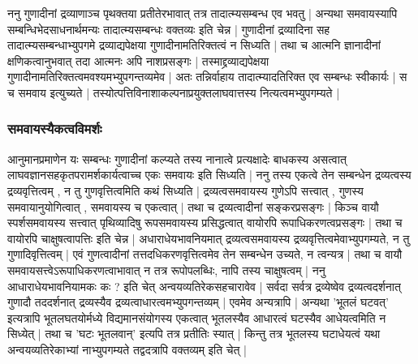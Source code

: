 ननु गुणादीनां द्रव्याणाञ्च पृथक्तया प्रतीतेरभावात् तत्र तादात्म्यसम्बन्ध एव भवतु | अन्यथा समवायस्यापि सम्बन्धिभेदसाधनार्थमन्यः तादात्म्यसम्बन्धः वक्तव्यः इति चेन्न | गुणादीनां द्रव्यादिना सह तादात्म्यसम्बन्धाभ्युपगमे द्रव्याद्यपेक्षया गुणादीनामतिरिक्तत्वं न सिध्यति | तथा च आत्मनि ज्ञानादीनां क्षणिकत्वानुभवात् तदा आत्मनः अपि नाशप्रसङ्गः | तस्माद्द्रव्याद्यपेक्षया गुणादीनामतिरिक्तत्वमवश्यमभ्युपगन्तव्यमेव | अतः तन्निर्वाहाय तादात्म्यादतिरिक्त एव सम्बन्धः स्वीकार्यः | स च समवाय इत्युच्यते | तस्योत्पत्तिविनाशाकल्पनाप्रयुक्तलाघवात्तस्य नित्यत्वमभ्युपगम्यते |


\subsubsection{समवायस्यैकत्वविमर्शः}

आनुमानप्रमाणेन यः सम्बन्धः गुणादीनां कल्प्यते तस्य नानात्वे प्रत्यक्षादेः बाधकस्य असत्वात् लाघवज्ञानसहकृतपरामर्शकार्यत्वाच्च एकः समवायः इति सिध्यति | ननु तस्य एकत्वे तेन सम्बन्धेन द्रव्यत्वस्य द्रव्यवृत्तित्वम् , न तु गुणवृत्तित्वमिति कथं सिध्यति | द्रव्यत्वसमवायस्य गुणेऽपि सत्त्वात् , गुणस्य समवायानुयोगित्वात् , समवायस्य च एकत्वात् | तथा च द्रव्यत्वादीनां सङ्करप्रसङ्गः | किञ्च वायौ स्पर्शसमवायस्य सत्त्वात् पृथिव्यादिषु रूपसमवायस्य प्रसिद्धत्वात् वायोरपि रूपाधिकरणत्वप्रसङ्गः | तथा च वायोरपि चाक्षुषत्वापत्तिः इति चेन्न | अधाराधेयभावनियमात् द्रव्यत्वसमवायस्य द्रव्यवृत्तित्वमेवाभ्युपगम्यते, न तु गुणादिवृत्तित्वम् | एवं गुणत्वादीनां तत्तदधिकरणवृत्तित्वमेव तेन सम्बन्धेन उच्यते, न त्वन्यत्र | तथा च वायौ समवायसत्त्वेऽरूपाधिकरणत्वाभावात् न तत्र रूपोपलब्धिः, नापि तस्य चाक्षुषत्वम् | ननु आधाराधेयभावनियामकः कः ? इति चेत् अन्वयव्यतिरेकसहचारावेव | सर्वदा सर्वत्र द्रव्येष्वेव द्रव्यत्वदर्शनात् गुणादौ तददर्शनात् द्रव्यस्यैव द्रव्यत्वाधारत्वमभ्युपगन्तव्यम् | एवमेव अन्यत्रापि | अन्यथा 'भूतलं घटवत्' इत्यत्रापि भूतलघतयोर्मध्ये विद्यमानसंयोगस्य एकत्वात् भूतलस्यैव आधारत्वं घटस्यैव आधेयत्वमिति न सिध्येत् | तथा च 'घटः भूतलवान्' इत्यपि तत्र प्रतीतिः स्यात् | किन्तु तत्र भूतलस्य घटाधेयत्वं यथा अन्वयव्यतिरेकाभ्यां नाभ्युपगम्यते तद्वदत्रापि वक्तव्यम् इति चेत् |

